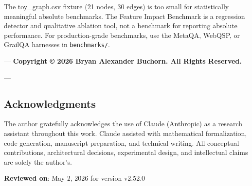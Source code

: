 The toy\_graph.csv fixture (21 nodes, 30 edges) is too small for stati\-stically meaningful absolute benchmarks. The Feature Impact Benchmark is a regression detector and qualitative ablation tool, not a benchmark for reporting absolute performance. For production-grade benchmarks, use the MetaQA, WebQSP, or GrailQA harnesses in \texttt{benchmarks/}.

---
\textbf{Copyright © 2026 Bryan Alexander Buchorn. All Rights Reserved.}

---
\subsection{Acknow\-ledgments}

The author gratefully ackno\-wledges the use of Claude (Anthropic) as a research assistant throughout this work. Claude assisted with mathe\-matical forma\-lization, code generation, manuscript preparation, and technical writing. All conceptual contr\-ibutions, archi\-tectural decisions, exper\-imental design, and intel\-lectual claims are solely the author's.

\textbf{Reviewed on}: May 2, 2026 for version v2.52.0
